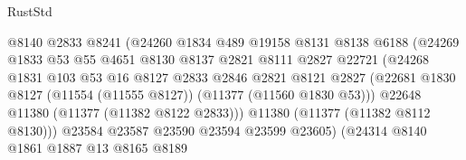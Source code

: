 \begin{lexlean}{RustStd}
\begin{coremodule}
                                    @8140
                                    @2833
                                    @8241
                                    (@24260
                                      @1834
                                      @489
                                      @19158
                                      @8131
                                      @8138
                                      @6188
                                      (@24269
                                        @1833
                                        @53
                                        @55
                                        @4651
                                        @8130
                                        @8137
                                        @2821
                                        @8111
                                        @2827
                                        @22721
                                        (@24268
                                          @1831
                                          @103
                                          @53
                                          @16
                                          @8127
                                          @2833
                                          @2846
                                          @2821
                                          @8121
                                          @2827
                                          (@22681
                                            @1830
                                            @8127
                                            (@11554 (@11555 @8127))
                                            (@11377 (@11560 @1830 @53)))
                                          @22648
                                          @11380
                                          (@11377 (@11382 @8122 @2833)))
                                        @11380
                                        (@11377 (@11382 @8112 @8130)))
                                      @23584
                                      @23587
                                      @23590
                                      @23594
                                      @23599
                                      @23605)
                                    (@24314
                                      @8140
                                      @1861
                                      @1887
                                      @13
                                      @8165
                                      @8189

\end{coremodule}
\end{lexlean}
